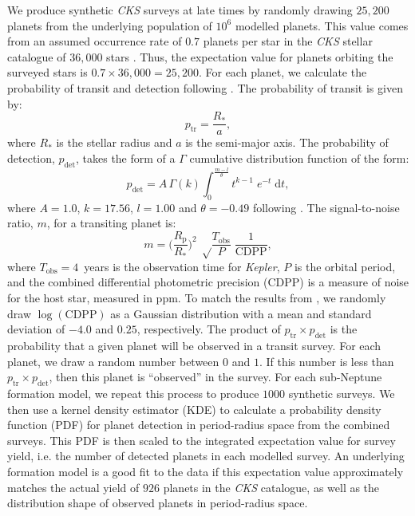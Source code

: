 \documentclass[fleqn,usenatbib]{mnras}
\begin{document}
We produce synthetic \textit{CKS} surveys at late times by randomly drawing $25,200$ planets from the underlying population of $10^6$ modelled planets. This value comes from an assumed occurrence rate of $0.7$ planets per star in the \textit{CKS} stellar catalogue of $36,000$ stars \citep{Fulton2017}. Thus, the expectation value for planets orbiting the surveyed stars is $0.7 \times 36,000 = 25,200$. For each planet, we calculate the probability of transit and detection following \citet{Fulton2017,Rogers2021,Petigura2022}. The probability of transit is given by:
\begin{equation}
    p_\text{tr} = \frac{R_*}{a},
\end{equation}
where $R_*$ is the stellar radius and $a$ is the semi-major axis. The probability of detection, $p_\text{det}$, takes the form of a $\Gamma$ cumulative distribution function of the form:
\begin{equation} \label{eq:pdet}
    p_\text{det} = A \, \Gamma(k) \int^{\frac{m-l}{\theta}}_{0} t^{k-1} \; e^{-t} \; \mathrm{d} t,
\end{equation}
where $A=1.0$, $k=17.56$, $l=1.00$ and $\theta=-0.49$ following \citet{Fulton2017}. The signal-to-noise ratio, $m$, for a transiting planet is:
\begin{equation} \label{eq:SNR}
   m = \bigg( \frac{R_\text{p}}{R_*}\bigg)^2 \; \sqrt \frac{T_\text{obs}}{P} \; \frac{1}{\text{CDPP}},
\end{equation}
where $T_\text{obs}=4$~years is the observation time for \textit{Kepler}, $P$ is the orbital period, and the combined differential photometric precision (CDPP) is a measure of noise for the host star, measured in ppm. To match the results from \citet{Koch2010}, we randomly draw $\log (\text{CDPP})$ as a Gaussian distribution with a mean and standard deviation of $-4.0$ and $0.25$, respectively. The product of $p_\text{tr} \times p_\text{det}$ is the probability that a given planet will be observed in a transit survey. For each planet, we draw a random number between $0$ and $1$. If this number is less than $p_\text{tr} \times p_\text{det}$, then this planet is ``observed'' in the survey. For each sub-Neptune formation model, we repeat this process to produce $1000$ synthetic surveys. We then use a kernel density estimator (KDE) to calculate a probability density function (PDF) for planet detection in period-radius space from the combined surveys. This PDF is then scaled to the integrated expectation value for survey yield, i.e. the number of detected planets in each modelled survey. An underlying formation model is a good fit to the data if this expectation value approximately matches the actual yield of $926$ planets in the \textit{CKS} catalogue, as well as the distribution shape of observed planets in period-radius space.
\end{document}
